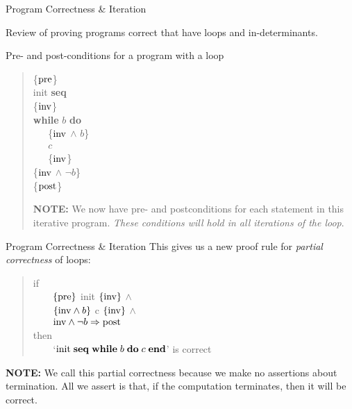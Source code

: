 \documentclass{beamer}
\begin{document}
\begin{frame}[fragile]{Program Correctness \& Iteration}

Review of proving programs correct that have loops and in-determinants.

\vspace{.1in}

Pre- and post-conditions for a program with a loop
\begin{quote}
\begin{minipage}{1.5in}
\{$\rm pre$\}\\
{\rm init} {\bf seq}\\
\{$\rm inv$\}  \\                                  
{\bf while} $b$ {\bf do}  \\                       
{\tt\verb"   "}\{$\rm inv$ $\wedge$ $b$\}  \\
{\tt\verb"   "}$c$    \\
{\tt\verb"   "}\{$\rm inv$\}  \\                            
\{$\rm inv$ $\wedge$ $\neg b$\}\\
\{$\rm post$\}  
\end{minipage}
\begin{minipage}{2in}
{\bf NOTE: } We now have pre- and postconditions for each statement in this iterative
program. {\em These conditions will hold in all iterations of the loop}.
\end{minipage}
\end{quote}                          
\end{frame}


\begin{frame}[fragile]{Program Correctness \& Iteration}
This gives us a new proof rule for {\em partial correctness} of loops:
\begin{quote}
if\\
{\verb"    "}$\{\rm pre\}$ {\rm init} $\{\rm inv\}$ $\wedge$\\
{\verb"    "}$\{{\rm inv} \wedge b\}$ c $\{\rm inv\}$ $\wedge$\\
{\verb"    "}${\rm inv} \wedge \neg b \Rightarrow {\rm post}$\\
then\\
{\verb"    "}`${\rm init}\; {\bf seq}\; {\bf while}\; {b}\;{\bf do}\;{c}\; \mbox{\bf end}$' is correct\\
\end{quote}

{\bf NOTE: } We call this partial correctness because we make no assertions about termination.
All we assert is that, if the computation terminates, then it will be correct.

\end{frame}
\end{document}
